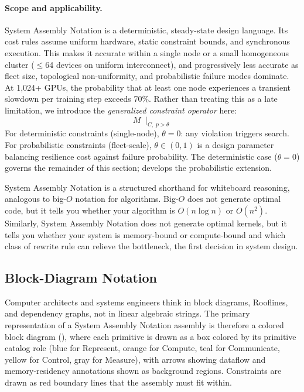 \documentclass[10pt,twocolumn]{article}
\begin{document}
\paragraph{Scope and applicability.} System Assembly Notation is a deterministic, steady-state design language. Its cost rules assume uniform hardware, static constraint bounds, and synchronous execution. This makes it accurate within a single node or a small homogeneous cluster ($\leq$64 devices on uniform interconnect), and progressively less accurate as fleet size, topological non-uniformity, and probabilistic failure modes dominate. At 1,024+ GPUs, the probability that at least one node experiences a transient slowdown per training step exceeds 70\%. Rather than treating this as a late limitation, we introduce the \emph{generalized constraint operator} here:
\begin{equation}
\label{eq:gen-constraint}
M \;\mid_{C,\; p > \theta}
\end{equation}
For deterministic constraints (single-node), $\theta = 0$: any violation triggers search. For probabilistic constraints (fleet-scale), $\theta \in (0, 1)$ is a design parameter balancing resilience cost against failure probability. The deterministic case ($\theta = 0$) governs the remainder of this section;  develops the probabilistic extension.

System Assembly Notation is a structured shorthand for whiteboard reasoning, analogous to big-$O$ notation for algorithms. Big-$O$ does not generate optimal code, but it tells you whether your algorithm is $O(n \log n)$ or $O(n^2)$. Similarly, System Assembly Notation does not generate optimal kernels, but it tells you whether your system is memory-bound or compute-bound and which class of rewrite rule can relieve the bottleneck, the first decision in system design.

\subsection{Block-Diagram Notation}
\label{sec:visual}

Computer architects and systems engineers think in block diagrams, Rooflines, and dependency graphs, not in linear algebraic strings. The primary representation of a System Assembly Notation assembly is therefore a colored block diagram (), where each primitive is drawn as a box colored by its primitive catalog role (blue for Represent, orange for Compute, teal for Communicate, yellow for Control, gray for Measure), with arrows showing dataflow and memory-residency annotations shown as background regions. Constraints are drawn as red boundary lines that the assembly must fit within.
\end{document}
